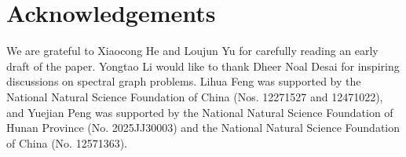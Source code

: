 \documentclass[11pt]{article}
\begin{document}
\section*{Acknowledgements} 

We are grateful to Xiaocong He and Loujun Yu for carefully reading an early draft of the paper.  
Yongtao Li would like to thank Dheer Noal Desai for inspiring discussions on spectral graph problems. 
 Lihua Feng was supported by the National Natural Science Foundation of China (Nos. 12271527 and 12471022), and Yuejian Peng was supported by 
 the National Natural Science Foundation of Hunan Province (No. 2025JJ30003) and 
the National Natural Science Foundation of China (No. 12571363).  


\end{document}
